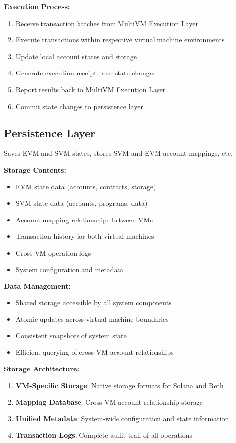 \documentclass[11pt,a4paper]{article}
\begin{document}
\textbf{Execution Process:}
\begin{enumerate}
    \item Receive transaction batches from MultiVM Execution Layer
    \item Execute transactions within respective virtual machine environments
    \item Update local account states and storage
    \item Generate execution receipts and state changes
    \item Report results back to MultiVM Execution Layer
    \item Commit state changes to persistence layer
\end{enumerate}

\subsection{Persistence Layer}
Saves EVM and SVM states, stores SVM and EVM account mappings, etc.

\textbf{Storage Contents:}
\begin{itemize}
    \item EVM state data (accounts, contracts, storage)
    \item SVM state data (accounts, programs, data)
    \item Account mapping relationships between VMs
    \item Transaction history for both virtual machines
    \item Cross-VM operation logs
    \item System configuration and metadata
\end{itemize}

\textbf{Data Management:}
\begin{itemize}
    \item Shared storage accessible by all system components
    \item Atomic updates across virtual machine boundaries
    \item Consistent snapshots of system state
    \item Efficient querying of cross-VM account relationships
\end{itemize}

\textbf{Storage Architecture:}
\begin{enumerate}
    \item \textbf{VM-Specific Storage}: Native storage formats for Solana and Reth
    \item \textbf{Mapping Database}: Cross-VM account relationship storage
    \item \textbf{Unified Metadata}: System-wide configuration and state information
    \item \textbf{Transaction Logs}: Complete audit trail of all operations
\end{enumerate}
\end{document}

